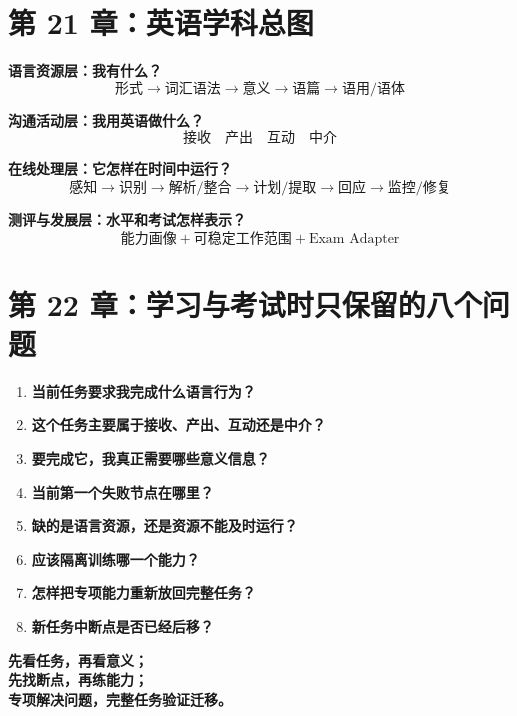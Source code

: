 \documentclass[11pt,a4paper]{ctexart}
\newcommand{\kw}[1]{\textbf{#1}}
\begin{document}
\section{第 21 章：英语学科总图}

\begin{corebox}[四层统一模型]
\textbf{语言资源层：我有什么？}
\[
\boxed{
\text{形式}
\rightarrow
\text{词汇语法}
\rightarrow
\text{意义}
\rightarrow
\text{语篇}
\rightarrow
\text{语用/语体}
}
\]

\textbf{沟通活动层：我用英语做什么？}
\[
\boxed{
\text{接收}
\quad
\text{产出}
\quad
\text{互动}
\quad
\text{中介}
}
\]

\textbf{在线处理层：它怎样在时间中运行？}
\[
\boxed{
\text{感知}
\rightarrow
\text{识别}
\rightarrow
\text{解析/整合}
\rightarrow
\text{计划/提取}
\rightarrow
\text{回应}
\rightarrow
\text{监控/修复}
}
\]

\textbf{测评与发展层：水平和考试怎样表示？}
\[
\boxed{
\text{能力画像}
+\text{可稳定工作范围}
+\text{Exam Adapter}
}
\]
\end{corebox}

\section{第 22 章：学习与考试时只保留的八个问题}
\begin{enumerate}
  \item \kw{当前任务要求我完成什么语言行为？}
  \item \kw{这个任务主要属于接收、产出、互动还是中介？}
  \item \kw{要完成它，我真正需要哪些意义信息？}
  \item \kw{当前第一个失败节点在哪里？}
  \item \kw{缺的是语言资源，还是资源不能及时运行？}
  \item \kw{应该隔离训练哪一个能力？}
  \item \kw{怎样把专项能力重新放回完整任务？}
  \item \kw{新任务中断点是否已经后移？}
\end{enumerate}

\begin{exam}[最终压缩口令]
\centering
\Large\bfseries
先看任务，再看意义；\\
先找断点，再练能力；\\
专项解决问题，完整任务验证迁移。
\end{exam}
\end{document}
